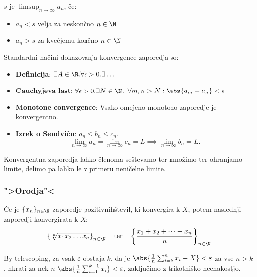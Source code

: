 \documentclass[12pt, a4paper, unicode]{article}
\begin{document}
\begin{definicija}
$s$ je $\limsup_{n\to \infty} a_n$, če:
\begin{itemize}
    \item $a_n < s$ velja za neskončno $n \in \N$
    \item $a_n > s$ za kvečjemu končno $n \in \N$
\end{itemize}
\end{definicija}

\begin{nasvet}
Standardni načini dokazovanja konvergence zaporedja so:
\begin{itemize}
    \item \textbf{Definicija}: $\exists A \in \R. \forall \epsilon > 0. \exists \dots$
    \item \textbf{Cauchyjeva last}: $\forall \epsilon > 0. \exists N \in \N$. $\forall m,n > N: \abs{a_m - a_n} < \epsilon$
    \item \textbf{Monotone convergence}: Vsako omejeno monotono zaporedje je konvergentno.
    \item \textbf{Izrek o Sendviču}: $a_n \leq b_n \leq c_n$. $$\lim_{n \to \infty} a_n = \lim_{n \to \infty} c_n = L \implies \lim_{n \to \infty} b_n = L.$$
\end{itemize}
\end{nasvet}
Konvergentna zaporedja lahko členoma seštevamo ter množimo ter ohranjamo limite, delimo pa lahko le v primeru neničelne limite.

\subsubsection{">Orodja"<}
\begin{izrek}[AG za zaporedja]
Če je $\{x_n\}_{n \in \N}$ zaporedje pozitivnih\footnotemark števil, ki konvergira k $X$, potem naslednji zaporedji konvergirata k $X$:
$$ \left\{ \sqrt[n]{x_1 x_2 \dots x_n} \right\}_{n \in \N} \quad \text{ter} \quad \left\{ \frac{x_1 + x_2 + \dots + x_n}{n} \right\}_{n \in \N}$$
\end{izrek}
\begin{oris}
By telescoping, za vsak $\varepsilon$ obstaja $k$, da je $\abs{\frac{1}{n}\sum_{i=k}^n x_i - X} < \varepsilon$ za vse $n >k$, hkrati za nek $n$ $\abs{\frac{1}{n}\sum_{i=1}^{k-1} x_i} < \varepsilon$, zaključimo z trikotniško neenakostjo.
\end{oris}
\end{document}
